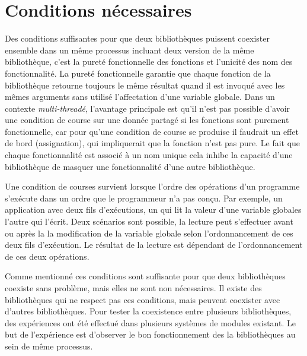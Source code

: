 

\section{Conditions nécessaires}%
Des conditions suffisantes pour que deux bibliothèques puissent coexister ensemble
dans un même processus incluant deux version de la même bibliothèque, c'est la pureté fonctionnelle des
fonctions et l'unicité des nom des fonctionnalité. La pureté fonctionnelle garantie
que chaque fonction de la bibliothèque retourne toujours le même résultat quand il
est invoqué avec les mêmes arguments sans utilisé l'affectation d'une variable globale.
Dans un contexte \textit{multi-threadé}, l'avantage principale est qu'il n'est pas possible
d'avoir une condition de course sur une donnée partagé si les fonctions sont purement fonctionnelle,
car pour qu'une condition de course se produise il faudrait un effet de bord (assignation), qui impliquerait
que la fonction n'est pas pure. Le fait que chaque fonctionnalité est associé à un nom unique cela inhibe
la capacité d'une bibliothèque de masquer une fonctionnalité d'une autre bibliothèque.

Une condition de courses
survient lorsque l'ordre des opérations d'un programme s'exécute dans un ordre
que le programmeur n'a pas conçu. Par exemple, un application avec deux fils
d'exécutions, un qui lit la valeur d'une variable globales l'autre qui l'écrit.
Deux scénarios sont possible, la lecture peut s'effectuer avant ou après la la
modification de la variable globale selon l'ordonnancement de ces deux fils d'exécution.
Le résultat de la lecture est dépendant de l'ordonnancement de ces deux opérations.

Comme mentionné ces conditions sont suffisante pour que deux bibliothèques coexiste sans problème,
mais elles ne sont non nécessaires. Il existe des bibliothèques
qui ne respect pas ces conditions, mais peuvent coexister avec d'autres
bibliothèques. Pour tester la coexistence entre plusieurs bibliothèques,
des expériences ont été effectué dans plusieurs systèmes de modules
existant. Le but de l'expérience est d'observer le bon fonctionnement
des la bibliothèques au sein de même processus.

